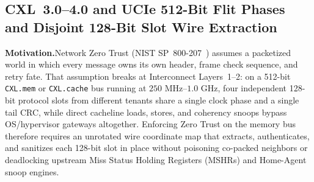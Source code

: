 \documentclass[11pt,letterpaper]{article}
\theoremstyle{spectralthm}
\begin{document}
\subsection{CXL~3.0--4.0 and UCIe 512-Bit Flit Phases and Disjoint 128-Bit Slot Wire Extraction}
\label{sec:wire}
\noindent\textbf{Motivation.}\;Network Zero Trust (NIST SP~800-207~\cite{rose2020zta}) assumes a packetized world in which every message owns its own header, frame check sequence, and retry fate. That assumption breaks at Interconnect Layers~1--2: on a 512-bit \texttt{CXL.mem} or \texttt{CXL.cache} bus running at $250\text{~MHz}$--$1.0\text{~GHz}$, four independent 128-bit protocol slots from different tenants share a single clock phase and a single tail CRC, while direct cacheline loads, stores, and coherency snoops bypass OS/hypervisor gateways altogether. Enforcing Zero Trust on the memory bus therefore requires an unrotated wire coordinate map that extracts, authenticates, and sanitizes each 128-bit slot in place without poisoning co-packed neighbors or deadlocking upstream Miss Status Holding Registers (MSHRs) and Home-Agent snoop engines.\par\smallskip
\end{document}
